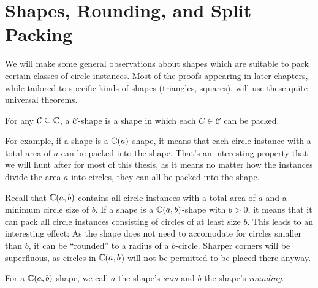 \documentclass[%
    a4paper,              %
    style=screen,          %
    bibliography=totoc,   %
    nexus,                %
    lnum,                 %
    extramargin,          %
]{tubsbook}
\begin{document}

\section{Shapes, Rounding, and Split Packing}

We will make some general observations about shapes which are suitable to pack certain classes of circle instances. Most of the proofs appearing in later chapters, while tailored to specific kinds of shapes (triangles, squares), will use these quite universal theorems.

\begin{definition}
    For any $\mathcal{C} \subseteq \mathbb{C}$, a $\mathcal{C}$-shape is a shape in which each $C \in \mathcal{C}$ can be packed.
\end{definition}

For example, if a shape is a $\mathbb{C}(a)$-shape, it means that each circle instance with a total area of $a$ can be packed into the shape. That's an interesting property that we will hunt after for most of this thesis, as it means no matter how the instances divide the area $a$ into circles, they can all be packed into the shape.

Recall that $\mathbb{C}(a,b)$ contains all circle instances with a total area of $a$ and a minimum circle size of $b$. If a shape is a $\mathbb{C}(a,b)$-shape with $b > 0$, it means that it can pack all circle instances consisting of circles of at least size $b$. This leads to an interesting effect: As the shape does not need to accomodate for circles smaller than $b$, it can be “rounded” to a radius of a $b$-circle. Sharper corners will be superfluous, as circles in $\mathbb{C}(a,b$) will not be permitted to be placed there anyway.

\begin{definition}
    For a $\mathbb{C}(a,b)$-shape, we call $a$ the shape's \emph{sum} and $b$ the shape's \emph{rounding}.
\end{definition}

\end{document}
